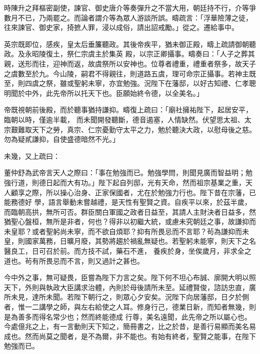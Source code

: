 \begin{pinyinscope}
 時陳升之拜樞密副使，諫官、御史唐介等奏彈升之不當大用，朝廷持不行，介等爭數月不已，乃兩罷之。而論者謂介等為眾人游談所誤。疇疏言：「浮華險薄之徒，往來諫官、御史家，掎摭人罪，浸以成俗，請出詔戒勵。」從之。遷給事中。



 英宗既即位，感疾，皇太后垂簾聽政。其後帝疾平，猶未御正殿，疇上疏請御朝聽政。及永昭陵復土，祭仁宗虞主於集英
 殿，以宗正卿攝事。疇奏曰：「人子之葬其親，送形而往，迎神而返，故虞祭所以安神也。位尊者禮重，禮重者祭多，故天子之虞數至於九。今山陵，嗣君不得親往，則道路五虞，理可命宗正攝事。若神主既至，則四虞之祭，雖或聖躬未寧，亦宜勉強。況陛下在藩邸，以好古知禮、仁孝聰明聞於中外，此先帝所以托天下也。臣願始終令德，以全美名。」



 帝既視朝前後殿，而於聽事猶持謙抑。疇復上疏曰：「廟社擁祐陛下，起居安平，臨朝以時，僅逾半載，
 而未聞開發聽斷，德音遏塞，人情缺然。伏望思太祖、太宗艱難取天下之勞，真宗、仁宗憂勤守太平之力，勉於聽決大政，以慰母後之慈。勿為疑貳謙抑，自使盛德暗然不光。」



 未幾，又上疏曰：



 董仲舒為武帝言天人之際曰：「事在勉強而已。勉強學問，則聞見廣而智益明；勉強行道，則德日起而大有功。」陛下起自列邸，光有天命，然而祖宗基業之重，天人顧享之際，所以操心治身、正家保國者，尤在於勉強力行也。陛下昔在宗藩，已能務德好
 學，語言舉動未嘗越禮，是天性有聖賢之資。自疾平以來，於茲半歲，而臨朝高拱，無所可否。群臣關白軍國之政者日益至，其請人主財決者日益多，然猶聖心盤桓，無所是非者，何也？得非以初繼大統，或慮未究朝廷之事，故謙抑而未皇耶？或者聖躬尚未寧，而不欲自煩耶？抑有所畏忌而不言耶？茍為謙抑而未皇，則國家萬務，日曠月廢，其勢將趨於禍亂無疑也。若聖躬未能寧，則天下之名醫良工，日可召於前。而方技不試，藥石不進，
 養疾於身，坐俟歲月，非求全之道也。茍有所畏忌而不言，則又過計之甚也。



 今中外之事，無可疑畏，臣嘗為陛下力言之矣。陛下何不坦心布誠、廓開大明以照天下，外則與執政大臣講求治體，內則於母後請所未至。延禮賢俊，諮訪忠直，廣所未見，達所未聞。若陛下朝行之，則眾心夕安矣。況陛下向居藩邸，日夕於側者，惟一二講學之師，與左右給使之人耳。修身行己，德業日新，而知者無幾，則是為善多而得名常少也；然而終能德成
 行尊，美名遠聞，此先帝之所以屬心也。今處億兆之上，有一言動則天下知之，簡冊書之，比之於昔，是善行易顯而美名易成也。然而尚莫之聞者，是不為爾，非不能也。有始有終者，聖賢之能事，在陛下勉強而已。




\end{pinyinscope}

